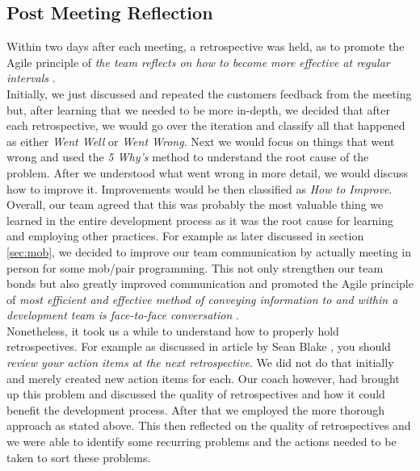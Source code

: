\documentclass{l3proj}
\begin{document}
        
    \subsection{Post Meeting Reflection}
    \label{sec:retrospectives}
        Within two days after each meeting, a retrospective was held, as to promote the Agile principle of \textit{the team reflects on how to become more effective at regular intervals} \cite{manifesto}.\\
        Initially, we just discussed and repeated the customers feedback from the meeting but, after learning that we needed to be more in-depth, we decided that after each retrospective, we would go over the iteration and classify all that happened as either \textit{Went Well} or \textit{Went Wrong}. Next we would focus on things that went wrong and used the \textit{5 Why's} \cite{whys} method to understand the root cause of the problem. After we understood what went wrong in more detail, we would discuss how to improve it. Improvements would be then classified as \textit{How to Improve}.
        \newline
        \newline
        Overall, our team agreed that this was probably the most valuable thing we learned in the entire development process as it was the root cause for learning and employing other practices. For example as later discussed in section \ref{sec:mob}, we decided to improve our team communication by actually meeting in person for some mob/pair programming. This not only strengthen our team bonds but also greatly improved communication and promoted the Agile principle of \textit{most efficient and effective method of conveying information to and within a development team is face-to-face conversation} \cite{manifesto}.\\
        Nonetheless, it took us a while to understand how to properly hold retrospectives. For example as discussed in article by Sean Blake \cite{retro}, you should \textit{review your action items at the next retrospective}. We did not do that initially and merely created new action items for each. Our coach however, had brought up this problem and discussed the quality of retrospectives and how it could benefit the development process. After that we employed the more thorough approach as stated above. This then reflected on the quality of retrospectives and we were able to identify some recurring problems and the actions needed to be taken to sort these problems. 
\end{document}
